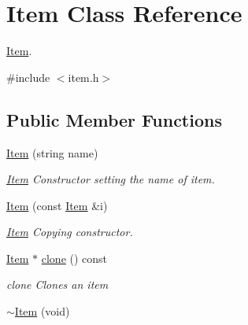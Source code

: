 \hypertarget{class_item}{\section{\-Item \-Class \-Reference}
\label{class_item}
}


\hyperlink{class_item}{\-Item}.  




{\ttfamily \#include $<$item.\-h$>$}

\subsection*{\-Public \-Member \-Functions}
\begin{DoxyCompactItemize}
\item 
\hyperlink{class_item_aad33eaa7360e0a10671cf9f106d3c15e}{\-Item} (string name)
\begin{DoxyCompactList}\small\item\em \hyperlink{class_item}{\-Item} \-Constructor setting the name of item. \end{DoxyCompactList}\item 
\hypertarget{class_item_ade7e491f0f1fb579f98c28f7079ace05}{\hyperlink{class_item_ade7e491f0f1fb579f98c28f7079ace05}{\-Item} (const \hyperlink{class_item}{\-Item} \&i)}\label{class_item_ade7e491f0f1fb579f98c28f7079ace05}

\begin{DoxyCompactList}\small\item\em \hyperlink{class_item}{\-Item} \-Copying constructor. \end{DoxyCompactList}\item 
\hyperlink{class_item}{\-Item} $\ast$ \hyperlink{class_item_a39b07e752ad862f82976715691bb8651}{clone} () const 
\begin{DoxyCompactList}\small\item\em clone \-Clones an item \end{DoxyCompactList}\item 
\hypertarget{class_item_a97a8192f17c60d0a628496a68131010e}{\hyperlink{class_item_a97a8192f17c60d0a628496a68131010e}{$\sim$\-Item} (void)}\label{class_item_a97a8192f17c60d0a628496a68131010e}


\end{DoxyCompactItemize}
